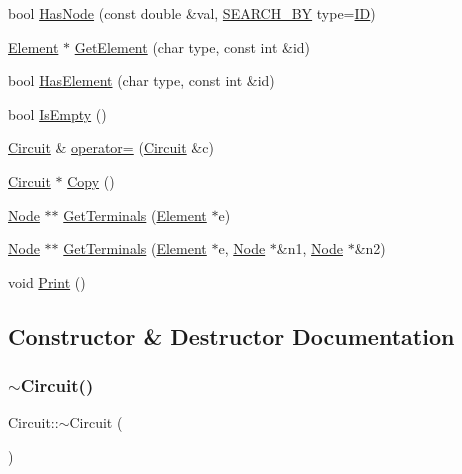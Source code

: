 \begin{DoxyCompactItemize}
\item 
bool \hyperlink{class_circuit_accc2583f39aa8860782a5a74b5badf74}{Has\+Node} (const double \&val, \hyperlink{_data_8h_a6262d734859ff0be0daa3fe3b8eccbcd}{S\+E\+A\+R\+C\+H\+\_\+\+BY} type=\hyperlink{_data_8h_a6262d734859ff0be0daa3fe3b8eccbcda001479a58fb44c39a29b20d565081a68}{ID})
\item 
\hyperlink{class_element}{Element} $\ast$ \hyperlink{class_circuit_a00cc4492fc12d0df63926d66482466ed}{Get\+Element} (char type, const int \&id)
\item 
bool \hyperlink{class_circuit_adbe87d6a9e119ddc538fd3354ba51ca7}{Has\+Element} (char type, const int \&id)
\item 
bool \hyperlink{class_circuit_a5b2435ea3098e3723272f8fc620228c8}{Is\+Empty} ()
\item 
\hyperlink{class_circuit}{Circuit} \& \hyperlink{class_circuit_a4f5f3e57b05982edbdabd135ffa72576}{operator=} (\hyperlink{class_circuit}{Circuit} \&c)
\item 
\hyperlink{class_circuit}{Circuit} $\ast$ \hyperlink{class_circuit_adfadd59857303052342b2b962e9b810d}{Copy} ()
\item 
\hyperlink{class_node}{Node} $\ast$$\ast$ \hyperlink{class_circuit_a2d6a6d1c971baa3ac838e92e935e12eb}{Get\+Terminals} (\hyperlink{class_element}{Element} $\ast$e)
\item 
\hyperlink{class_node}{Node} $\ast$$\ast$ \hyperlink{class_circuit_a1e4a92a398972c7dbf8a19c4943626bc}{Get\+Terminals} (\hyperlink{class_element}{Element} $\ast$e, \hyperlink{class_node}{Node} $\ast$\&n1, \hyperlink{class_node}{Node} $\ast$\&n2)
\item 
void \hyperlink{class_circuit_a01dac750b9078c5b820fe32429b5194a}{Print} ()
\end{DoxyCompactItemize}


\subsection{Constructor \& Destructor Documentation}
\mbox{\label{class_circuit_a1134e16f26a878377f4d502bff111b9e}} 
\subsubsection{\texorpdfstring{$\sim$\+Circuit()}{~Circuit()}}
{\footnotesize\ttfamily Circuit\+::$\sim$\+Circuit (\begin{DoxyParamCaption}{ }\end{DoxyParamCaption})}

